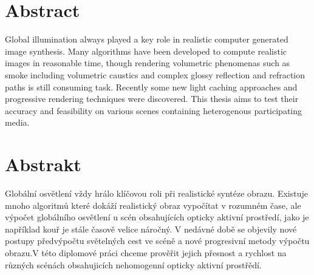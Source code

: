 \section*{Abstract}
\indent\indent 
Global illumination always played a key role in realistic computer generated image synthesis. Many algorithms have been developed to compute realistic images in reasonable time, though rendering volumetric phenomenas such as smoke including volumetric caustics and complex glossy reflection and refraction paths is still consuming task. Recently some new light caching approaches and progressive rendering techniques were discovered. This thesis aims to test their accuracy and feasibility on various scenes containing heterogenous participating media. 

\section*{Abstrakt}\label{abstract}
\indent\indent 
Globální osvětlení vždy hrálo klíčovou roli při realistické syntéze obrazu. Existuje mnoho algoritmů které dokáží realistický obraz vypočítat v rozumném čase, ale výpočet globálního osvětlení u scén obsahujících opticky aktivní prostředí, jako je například kouř je stále časově velice náročný. V nedávné době se objevily nové postupy předvýpočtu světelných cest ve scéně a nové progresivní metody výpočtu obrazu.V této diplomové práci chceme prověřit jejich přesnost a rychlost na různých scénách obsahujicích nehomogenní opticky aktivní prostřědí.

